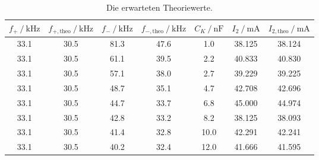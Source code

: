 \begin{table}
    \centering
    \caption{Die erwarteten Theoriewerte.}
    \label{tab:theorie}
    \begin{tabular}{c c c c c c c}
        \toprule
        $f_+ \:/\: \si{\kilo\hertz}$ & $f_{+, \text{theo}} \:/\: \si{\kilo\hertz}$ & $f_- \:/\: \si{\kilo\hertz}$ & $f_{-, \text{theo}} \:/\: \si{\kilo\hertz}$ & $C_K \:/\: \si{\nano\farad}$ & $I_2 \:/\: \si{\milli\ampere}$ & $I_{2,\text{theo}} \:/\: \si{\milli\ampere}$ \\
        \midrule
        33.1 & 30.5 & 81.3 & 47.6 & 1.0  &  38.125 & 38.124 \\  
        33.1 & 30.5 & 61.1 & 39.5 & 2.2  &  40.833 & 40.830 \\
        33.1 & 30.5 & 57.1 & 38.0 & 2.7  &  39.229 & 39.225 \\
        33.1 & 30.5 & 48.7 & 35.1 & 4.7  &  42.708 & 42.696 \\
        33.1 & 30.5 & 44.7 & 33.7 & 6.8  &  45.000 & 44.974 \\
        33.1 & 30.5 & 42.8 & 33.2 & 8.2  &  38.125 & 38.093 \\
        33.1 & 30.5 & 41.4 & 32.8 & 10.0 &  42.291 & 42.241 \\
        33.1 & 30.5 & 40.2 & 32.4 & 12.0 &  41.666 & 41.595 \\
        \bottomrule
    \end{tabular}
\end{table}

\pagebreak